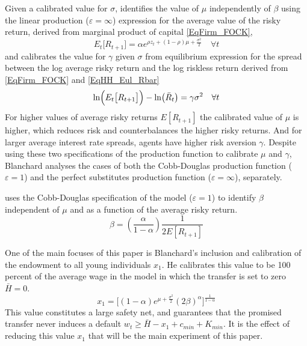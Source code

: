 \documentclass[letterpaper,12pt]{article}
\theoremstyle{definition}
\newcommand\ve{\varepsilon}
\begin{document}
  Given a calibrated value for $\sigma$, \citet[p. 1213]{Blanchard:2019} identifies the value of $\mu$ independently of $\beta$ using the linear production ($\ve=\infty$) expression for the average value of the risky return, derived from marginal product of capital \eqref{EqFirm_FOCK},
  \begin{equation}\label{EqCalib_ERtp1_inf}
    E_t\bigl[R_{t+1}\bigr] = \alpha e^{\rho z_t + (1-\rho)\mu + \frac{\sigma^2}{2}} \quad\forall t
  \end{equation}
  and calibrates the value for $\gamma$ given $\sigma$ from equilibrium expression for the spread between the log average risky return and the log riskless return derived from \eqref{EqFirm_FOCK} and \eqref{EqHH_Eul_Rbar}
  \begin{equation}\label{EqCalib_spread}
    \ln\Bigl(E_t\bigl[R_{t+1}\bigr]\Bigr) - \ln\bigl(\bar{R}_t\bigr) = \gamma\sigma^2 \quad\forall t
  \end{equation}
  For higher values of average risky returns $E[R_{t+1}]$ the calibrated value of $\mu$ is higher, which reduces risk and counterbalances the higher risky returns. And for larger average interest rate spreads, agents have higher risk aversion $\gamma$. Despite using these two specifications of the production function to calibrate $\mu$ and $\gamma$, Blanchard analyses the cases of both the Cobb-Douglas production function ($\ve=1$) and the perfect substitutes production function ($\ve=\infty$), separately.

  \citet{Blanchard:2019} uses the Cobb-Douglas specification of the model ($\ve=1$) to identify $\beta$ independent of $\mu$ and as a function of the average risky return.
  \begin{equation}\label{EqCalib_beta}
    \beta = \left(\frac{\alpha}{1-\alpha}\right)\frac{1}{2 E[R_{t+1}]}
  \end{equation}

  One of the main focuses of this paper is Blanchard's inclusion and calibration of the endowment to all young individuals $x_1$. He calibrates this value to be 100 percent of the average wage in the model in which the transfer is set to zero $\bar{H}=0$.
  \begin{equation}\label{EqCalib_x1}
    x_1 = \Big[(1-\alpha)e^{\mu + \frac{\sigma^2}{2}}(2\beta)^\alpha\Bigr]^\frac{1}{1-\alpha}
  \end{equation}
  This value constitutes a large safety net, and guarantees that the promised transfer never induces a default $w_t \geq \bar{H} - x_1 + c_{min} + K_{min}$. It is the effect of reducing this value $x_1$ that will be the main experiment of this paper.
\end{document}
